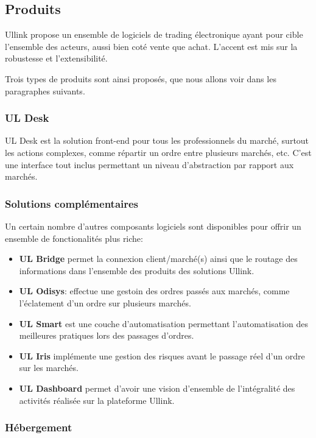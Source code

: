 \documentclass[a4paper, 12pt]{article}
\begin{document}
\subsection{Produits}

Ullink propose un ensemble de logiciels de trading électronique ayant pour cible l'ensemble des acteurs, aussi bien coté vente que achat. L'accent est mis sur la robustesse et l'extensibilité.

Trois types de produits sont ainsi proposés, que nous allons voir dans les paragraphes suivants.

\subsubsection{UL Desk}

UL Desk est la solution front-end pour tous les professionnels du marché, surtout les actions complexes, comme répartir un ordre entre plusieurs marchés, etc. C'est une interface tout inclus permettant un niveau d'abstraction par rapport aux marchés.

\subsubsection{Solutions complémentaires}
Un certain nombre d'autres composants logiciels sont disponibles pour offrir un ensemble de fonctionalités plus riche:

\begin{itemize}
\item{{\bf UL Bridge} permet la connexion client/marché(s) ainsi que le routage des informations dans l'ensemble des produits des solutions Ullink.}
\item{{\bf UL Odisys}: effectue une gestoin des ordres passés aux marchés, comme l'éclatement d'un ordre sur plusieurs marchés.}
\item{{\bf UL Smart} est une couche d'automatisation permettant l'automatisation des meilleures pratiques lors des passages d'ordres.}
\item{{\bf UL Iris} implémente une gestion des risques avant le passage réel d'un ordre sur les marchés.}
\item{{\bf UL Dashboard} permet d'avoir une vision d'ensemble de l'intégralité des activités réalisée sur la plateforme Ullink.}
\end{itemize}

\subsubsection{Hébergement}
\end{document}
